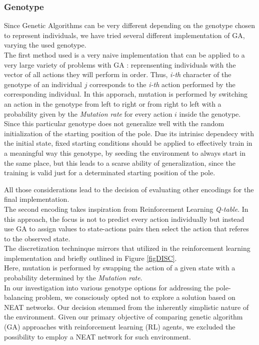 \subsubsection{Genotype}
Since Genetic Algorithms can be very different depending on the genotype chosen to represent individuals, we have tried several different implementation of GA, varying the used genotype.
\\


The first method used is a very naive implementation that can be applied to a very large variety of problems with GA : reprensenting individuals with the vector of all actions they will perform in order.
Thus, \textit{i-th} character of the genotype of an individual $j$ corresponds to the \textit{i-th} action performed by the corresponding individual.
In this apporach, mutation is performed by switching an action in the genotype from left to right or from right to left with a probability given by the \textit{Mutation rate} for every action $i$ inside the genotype.
\\
Since this particular genotype does not generalize well with the random initialization of the starting position of the pole. Due its intrinisc dependecy with the initial state, fixed starting conditions should be applied to effectively train in a meaningful way this genotype, by seeding the environment to always start in the same place, but this leads to a scarse ability of generalization, since the training is valid just for a determinated starting position of the pole.

All those considerations lead to the decision of evaluating other encodings for the final implementation.\\

The second encoding takes inspiration from Reinforcement Learning \textit{Q-table}.
In this approach, the focus is not to predict every action individually  but instead use GA to assign values to state-actions pairs then select the action that referes to the observed state.\\
The discretization techninque mirrors that utilized in the reinforcement learning implementation and briefly outlined in Figure \ref{figDISC}.\\
Here, mutation is performed by swapping the action of a given state with a probability determined by the \textit{Mutation rate}.
\\
In our investigation into various genotype options for addressing the pole-balancing problem, we consciously opted not to explore a solution based on NEAT\cite{6790655} networks. Our decision stemmed from the inherently simplistic nature of the environment. Given our primary objective of comparing genetic algorithm (GA) approaches with reinforcement learning (RL) agents, we excluded the possibility to employ a NEAT network for such environment.

